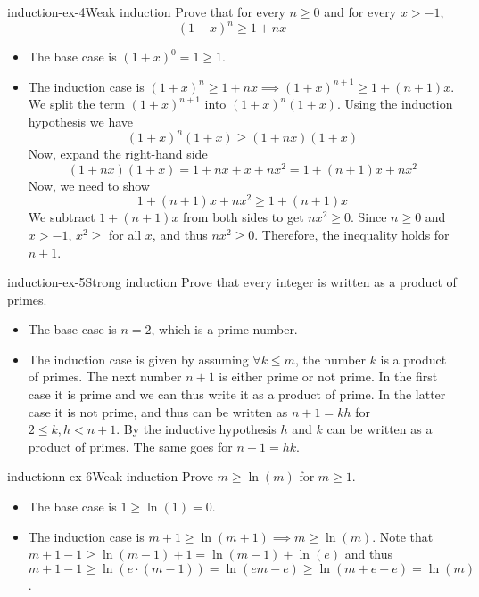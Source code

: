 \documentclass[preview]{standalone}
\begin{document}
\begin{snippetexercise}{induction-ex-4}{Weak induction}
    Prove that for every \(n \geq 0\) and for every \(x > -1\),
    \[
        {(1+x)}^n \geq 1 + nx
    \]
    \begin{itemize}
        \item The base case is \({(1+x)}^0 = 1 \geq 1\).
        \item The induction case is \({(1+x)}^n \geq 1 + nx \implies {(1+x)}^{n+1} \geq 1 + (n+1)x\).
            We split the term \({(1+x)}^{n+1}\) into \({(1+x)}^n(1+x)\).
            Using the induction hypothesis we have \[{(1+x)}^n(1+x) \geq (1+nx)(1+x)\]
            Now, expand the right-hand side \[(1+nx)(1+x) = 1 + nx + x + nx^2 = 1 + (n+1)x + nx^2\]
            Now, we need to show \[1+(n+1)x + nx^2 \geq 1 + (n+1)x\]
            We subtract \(1+(n+1)x\) from both sides to get \(nx^2 \geq 0\).
            Since \(n \geq 0\) and \(x > -1\), \(x^2 \geq \) for all \(x\), and thus \(nx^2 \geq 0\).
            Therefore, the inequality holds for \(n+1\). 
    \end{itemize}
\end{snippetexercise}

\begin{snippetexercise}{induction-ex-5}{Strong induction}
    Prove that every integer is written as a product of primes.
    \begin{itemize}
        \item The base case is \(n=2\), which is a prime number.
        \item The induction case is given by assuming \(\forall k \leq m\),
        the number \(k\) is a product of primes. The next number \(n+1\)
        is either prime or not prime. In the first case it is prime and we can thus
        write it as a product of prime. In the latter case it is not prime, and thus can be written
        as \(n+1 = kh\) for \(2\leq k,h< n+1\).
        By the inductive hypothesis \(h\) and \(k\) can be written as a product of primes.
        The same goes for \(n+1=hk\). 
    \end{itemize}
\end{snippetexercise}

\begin{snippetexercise}{inductionn-ex-6}{Weak induction}
    Prove \(m \geq \ln(m)\) for \(m \geq 1\).
    \begin{itemize}
        \item The base case is \(1 \geq \ln(1)=0\).
        \item The induction case is \(m + 1\geq \ln(m + 1) \implies m \geq \ln(m)\).
        Note that \(m + 1 - 1 \geq \ln(m-1) + 1 = \ln(m-1) + \ln(e)\)
        and thus \(m + 1 - 1 \geq \ln(e\cdot(m-1)) = \ln(em-e) \geq \ln(m + e - e) = \ln(m)\).
    \end{itemize}
\end{snippetexercise}
\end{document}
